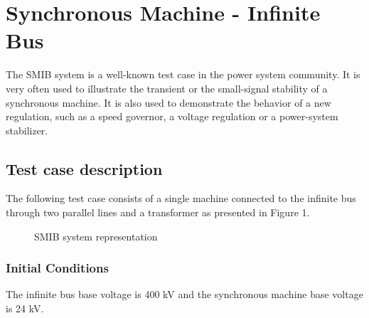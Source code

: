 \documentclass[a4paper, 12pt]{report}
\begin{document}
\chapter{Synchronous Machine - Infinite Bus}

The SMIB system is a well-known test case in the power system community. It is very often used to illustrate the transient or the small-signal stability of a synchronous machine. It is also used to demonstrate the behavior of a new regulation, such as a speed governor, a voltage regulation or a power-system stabilizer.

\section{Test case description}

The following test case consists of a single machine connected to the infinite bus through two parallel lines and a transformer as presented in Figure 1.

\begin{figure}[H]
\centering
\def\factor{0.4}
\caption{SMIB system representation}
\label{circuit-1}
\end{figure}

\subsection{Initial Conditions}

The infinite bus base voltage is 400 kV and the synchronous machine base voltage is 24 kV. \\
\end{document}
